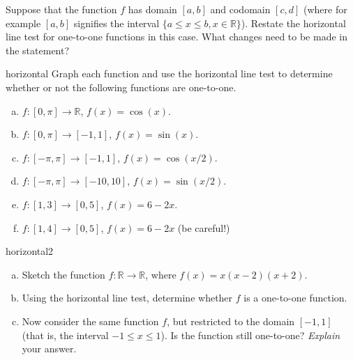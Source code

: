 \begin{exercise}{}
Suppose that the function $f$ has domain $[a,b]$ and codomain $[c,d]$ (where for example $[a,b]$ signifies the interval $\{ a \le x \le b, x \in \mathbb{R} \}$). Restate the horizontal line test for one-to-one functions in this case. What changes need to be made in the statement?
\end{exercise}

\begin{exercise}{horizontal}
Graph each function and use the horizontal line test to determine whether or not the following functions are one-to-one.
\begin{enumerate}[(a)]
\item
$f:[0,\pi] \rightarrow \mathbb{R}$, $f(x) = \cos(x)$.
\item
$f:[0,\pi] \rightarrow [-1,1]$, $f(x) = \sin(x)$.
\item
$f:[-\pi,\pi] \rightarrow [-1,1]$, $f(x) =\cos(x/2)$.
\item
$f:[-\pi,\pi] \rightarrow [-10,10]$, $f(x) = \sin(x/2)$.
\item
$f:[1,3] \rightarrow [0,5]$, $f(x) = 6 - 2x$.
\item
$f:[1,4] \rightarrow [0,5]$, $f(x) = 6 - 2x$ (be careful!)
\end{enumerate}
\end{exercise}

\begin{exercise}{horizontal2}
\begin{enumerate}[(a)]
\item
Sketch the function $f:\mathbb{R} \rightarrow \mathbb{R}$, where $f(x) = x(x-2)(x+2)$.
\item
Using the horizontal line test, determine whether $f$ is a one-to-one function.
\item
Now consider the same function $f$, but restricted to the domain $[-1,1]$  (that is, the interval $-1 \le x \le 1$). Is the function still one-to-one? \emph{Explain} your answer.
\end{enumerate}
\end{exercise}



